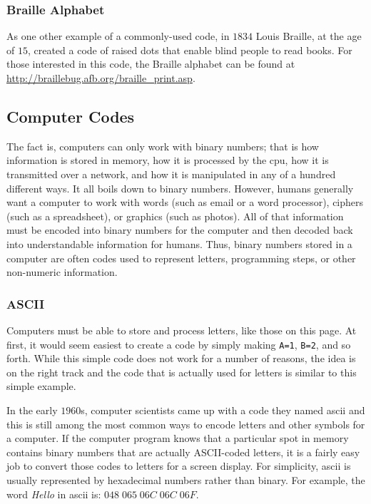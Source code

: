 \subsubsection{Braille Alphabet}
\label{MO:subsub:braille_alphabet}

As one other example of a commonly-used code, in $ 1834 $ Louis Braille, at the age of $ 15 $, created a code of raised dots that enable blind people to read books. For those interested in this code, the Braille alphabet can be found at \url{http://braillebug.afb.org/braille_print.asp}. 

\subsection{Computer Codes}
\label{MO:sub:computer_codes}

The fact is, computers can only work with binary numbers; that is how information is stored in memory, how it is processed by the \gls{cpu}, how it is transmitted over a network, and how it is manipulated in any of a hundred different ways. It all boils down to binary numbers. However, humans generally want a computer to work with words (such as email or a word processor), ciphers (such as a spreadsheet), or graphics (such as photos). All of that information must be encoded into binary numbers for the computer and then decoded back into understandable information for humans. Thus, binary numbers stored in a computer are often codes used to represent letters, programming steps, or other non-numeric information. 

\subsubsection{ASCII}
\label{MO:subsub:ascii}

Computers must be able to store and process letters, like those on this page. At first, it would seem easiest to create a code by simply making \lstinline[columns=fixed]|A=1|, \lstinline[columns=fixed]|B=2|, and so forth. While this simple code does not work for a number of reasons, the idea is on the right track and the code that is actually used for letters is similar to this simple example. 

In the early $ 1960 $s, computer scientists came up with a code they named \gls{ascii} and this is still among the most common ways to encode letters and other symbols for a computer. If the computer program knows that a particular spot in memory contains binary numbers that are actually ASCII-coded letters, it is a fairly easy job to convert those codes to letters for a screen display. For simplicity, \gls{ascii} is usually represented by hexadecimal numbers rather than binary. For example, the word \emph{Hello} in \gls{ascii} is: $ 048 \; 065 \; 06C \; 06C \; 06F $.


